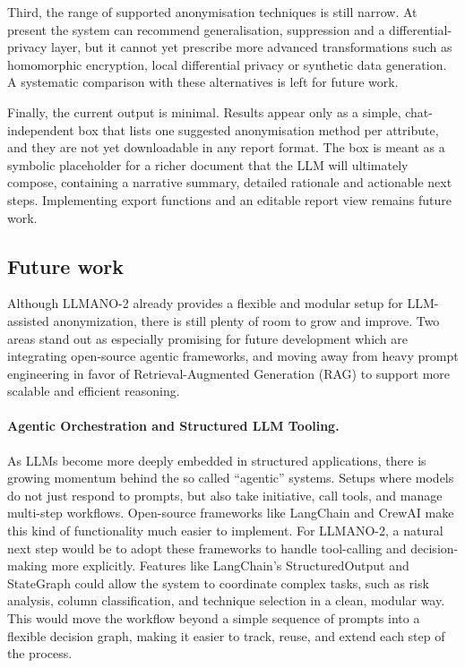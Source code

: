 \documentclass{article}
\begin{document}
Third, the range of supported anonymisation techniques is still narrow.  At present the system can recommend generalisation, suppression and a differential-privacy layer, but it cannot yet prescribe more advanced transformations such as homomorphic encryption, local differential privacy or synthetic data generation.  A systematic comparison with these alternatives is left for future work.  

Finally, the current output is minimal.  Results appear only as a simple, chat-independent box that lists one suggested anonymisation method per attribute, and they are not yet downloadable in any report format.  The box is meant as a symbolic placeholder for a richer document that the LLM will ultimately compose, containing a narrative summary, detailed rationale and actionable next steps.  Implementing export functions and an editable report view remains future work.

\subsection{Future work}

Although LLMANO-2 already provides a flexible and modular setup for LLM-assisted anonymization, there is still plenty of room to grow and improve. Two areas stand out as especially promising for future development which are integrating open-source agentic frameworks, and moving away from heavy prompt engineering in favor of Retrieval-Augmented Generation (RAG) to support more scalable and efficient reasoning.

\paragraph{Agentic Orchestration and Structured LLM Tooling.}
As LLMs become more deeply embedded in structured applications, there is growing momentum behind the so called “agentic” systems. Setups where models do not just respond to prompts, but also take initiative, call tools, and manage multi-step workflows. Open-source frameworks like LangChain and CrewAI make this kind of functionality much easier to implement. For LLMANO-2, a natural next step would be to adopt these frameworks to handle tool-calling and decision-making more explicitly. Features like LangChain’s StructuredOutput and StateGraph could allow the system to coordinate complex tasks, such as risk analysis, column classification, and technique selection in a clean, modular way. This would move the workflow beyond a simple sequence of prompts into a flexible decision graph, making it easier to track, reuse, and extend each step of the process.
\end{document}
